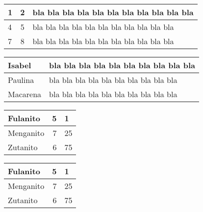 \documentclass[11pt, a4paper]{article}
\begin{document}
\bigskip
%
\begin{tabular}{|l|c||p{3cm}|}
\hline
1 & 2 & bla bla bla bla bla bla bla bla bla bla bla  \\
\hline\hline
4 & 5 & bla bla bla bla bla bla bla bla bla bla bla  \\ 
7 & 8 & bla bla bla bla bla bla bla bla bla bla bla  \\ 
\hline
\end{tabular} 





\bigskip
%
\begin{tabular}{|l@{ dijo: }p{2.5cm}|}
\hline
Isabel     &  bla bla bla bla bla bla bla bla bla bla  \\
\hline
Paulina    &  bla bla bla bla bla bla bla bla bla bla  \\ 
\hline
Macarena &  bla bla bla bla bla bla bla bla bla bla  \\
\hline
\end{tabular} 







\bigskip
%
\begin{tabular}{|l|r@{,}l|}
\hline
Fulanito     &   5 & 1 \\
\hline
Menganito    &   7 & 25 \\
\hline
Zutanito     &   6 & 75 \\
\hline
\end{tabular} 




\bigskip
%
\begin{tabular}{|l|@{\hspace{20mm}}r@{,}l@{\hspace{5mm}}|}
\hline
Fulanito     &   5 & 1 \\
\hline
Menganito    &   7 & 25 \\
\hline
Zutanito     &   6 & 75 \\
\hline
\end{tabular} 
\end{document}
